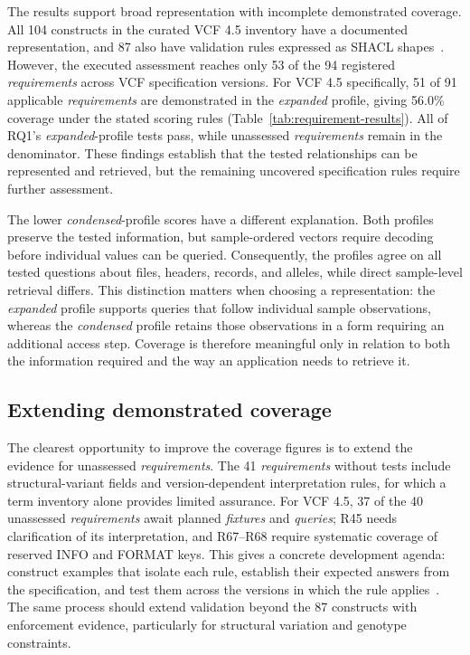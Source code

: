 The results support broad representation with incomplete demonstrated coverage.
All 104 constructs in the curated VCF 4.5 inventory have a documented representation, and 87 also have validation rules expressed as SHACL shapes~\cite{shacl2017}.
However, the executed assessment reaches only 53 of the 94 registered \emph{requirements} across VCF specification versions.
For VCF 4.5 specifically, 51 of 91 applicable \emph{requirements} are demonstrated in the \textit{expanded} profile, giving 56.0\% coverage under the stated scoring rules (Table~\ref{tab:requirement-results}).
All of RQ1's \textit{expanded}-profile tests pass, while unassessed \emph{requirements} remain in the denominator.
These findings establish that the tested relationships can be represented and retrieved, but the remaining uncovered specification rules require further assessment.

The lower \textit{condensed}-profile scores have a different explanation.
Both profiles preserve the tested information, but sample-ordered vectors require decoding before individual values can be queried.
Consequently, the profiles agree on all tested questions about files, headers, records, and alleles, while direct sample-level retrieval differs.
This distinction matters when choosing a representation: the \textit{expanded} profile supports queries that follow individual sample observations, whereas the \textit{condensed} profile retains those observations in a form requiring an additional access step.
Coverage is therefore meaningful only in relation to both the information required and the way an application needs to retrieve it.

\subsection{Extending demonstrated coverage}

The clearest opportunity to improve the coverage figures is to extend the evidence for unassessed \emph{requirements}.
The 41 \emph{requirements} without tests include structural-variant fields and version-dependent interpretation rules, for which a term inventory alone provides limited assurance.
For VCF 4.5, 37 of the 40 unassessed \emph{requirements} await planned \emph{fixtures} and \emph{queries}; R45 needs clarification of its interpretation, and R67--R68 require systematic coverage of reserved INFO and FORMAT keys.
This gives a concrete development agenda: construct examples that isolate each rule, establish their expected answers from the specification, and test them across the versions in which the rule applies~\cite{samod2016,blomqvist2012ontologytesting}.
The same process should extend validation beyond the 87 constructs with enforcement evidence, particularly for structural variation and genotype constraints.

